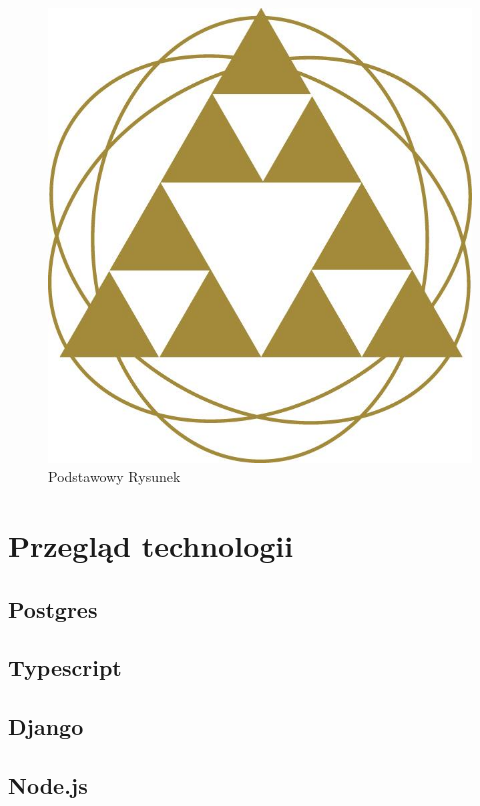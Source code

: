 \documentclass[inzynierska]{pwr_wmat_praca_dyplomowa}
\theoremstyle{plain}
\numberwithin{theorem}{chapter}
\theoremstyle{definition}
\numberwithin{theorem}{chapter}
\begin{document}
    \begin{figure}[ht]

        \centering

        \includegraphics[scale=0.27]{logo_w13.jpg}
        \caption{Podstawowy Rysunek}\label{rys1}
    \end{figure}
    \label{rys:przykladowy}

    \chapter{Przegląd technologii}
    \section{Postgres}
    \section{Typescript}
    \section{Django}
    \section{Node.js}
\end{document}
